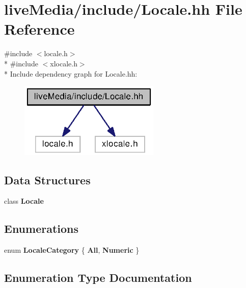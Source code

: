 \section{live\+Media/include/\+Locale.hh File Reference}
\label{Locale_8hh}
{\ttfamily \#include $<$locale.\+h$>$}\\*
{\ttfamily \#include $<$xlocale.\+h$>$}\\*
Include dependency graph for Locale.\+hh\+:
\nopagebreak
\begin{figure}[H]
\begin{center}
\leavevmode
\includegraphics[width=190pt]{Locale_8hh__incl}
\end{center}
\end{figure}
\subsection*{Data Structures}
\begin{DoxyCompactItemize}
\item 
class {\bf Locale}
\end{DoxyCompactItemize}
\subsection*{Enumerations}
\begin{DoxyCompactItemize}
\item 
enum {\bf Locale\+Category} \{ {\bf All}, 
{\bf Numeric}
 \}
\end{DoxyCompactItemize}


\subsection{Enumeration Type Documentation}
